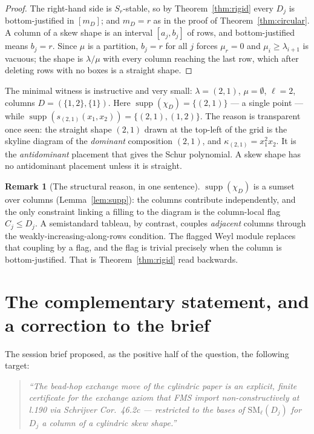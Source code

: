 \documentclass[11pt]{article}
\theoremstyle{definition}
\newtheorem{rem}[thm]{Remark}
\DeclareMathOperator{\supp}{supp}
\newcommand{\SM}{\mathrm{SM}}
\begin{document}
\begin{proof}
The right-hand side is $S_r$-stable, so by Theorem~\ref{thm:rigid} every $D_j$ is
bottom-justified in $[m_D]$; and $m_D=r$ as in the proof of Theorem~\ref{thm:circular}. A column
of a skew shape is an interval $[a_j,b_j]$ of rows, and bottom-justified means $b_j=r$. Since
$\mu$ is a partition, $b_j=r$ for all $j$ forces $\mu_r=0$ and $\mu_i\ge\lambda_{i+1}$ is
vacuous; the shape is $\lambda/\mu$ with every column reaching the last row, which after
deleting rows with no boxes is a straight shape.
\end{proof}

The minimal witness is instructive and very small: $\lambda=(2,1)$, $\mu=\emptyset$, $\ell=2$,
columns $D=(\{1,2\},\{1\})$. Here $\supp(\chi_D)=\{(2,1)\}$ --- a single point --- while
$\supp(s_{(2,1)}(x_1,x_2))=\{(2,1),(1,2)\}$. The reason is transparent once seen: the straight
shape $(2,1)$ drawn at the top-left of the grid is the skyline diagram of the \emph{dominant}
composition $(2,1)$, and $\kappa_{(2,1)}=x_1^2x_2$. It is the \emph{antidominant} placement that
gives the Schur polynomial. A skew shape has no antidominant placement unless it is straight.

\begin{rem}[The structural reason, in one sentence]
$\supp(\chi_D)$ is a sumset over columns (Lemma~\ref{lem:supp}): the columns contribute
independently, and the only constraint linking a filling to the diagram is the column-local
flag $C_j\le D_j$. A semistandard tableau, by contrast, couples \emph{adjacent} columns through
the weakly-increasing-along-rows condition. The flagged Weyl module replaces that coupling by a
flag, and the flag is trivial precisely when the column is bottom-justified. That is
Theorem~\ref{thm:rigid} read backwards.
\end{rem}

\section{The complementary statement, and a correction to the brief}

The session brief proposed, as the positive half of the question, the following target:

\begin{quote}
\emph{``The bead-hop exchange move of the cylindric paper is an explicit, finite certificate for
the exchange axiom that FMS import non-constructively at l.190 via Schrijver Cor.~46.2c ---
restricted to the bases of $\SM_\ell(D_j)$ for $D_j$ a column of a cylindric skew shape.''}
\end{quote}
\end{document}
